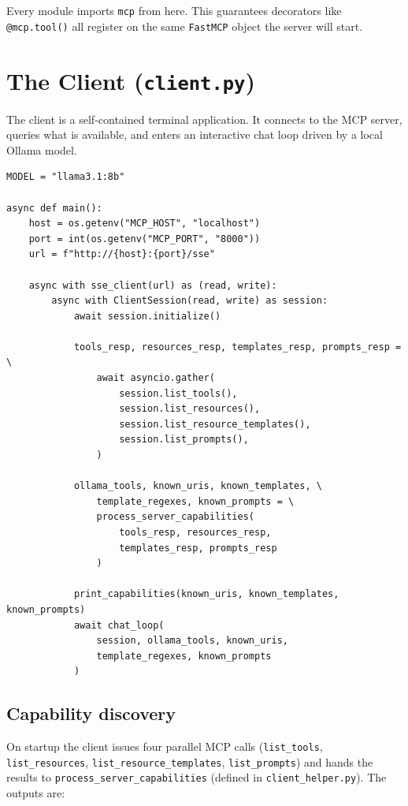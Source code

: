 \documentclass[11pt, a4paper]{article}
\begin{document}
Every module imports \lstinline{mcp} from here. This guarantees decorators like \lstinline{@mcp.tool()} all register on the same \lstinline{FastMCP} object the server will start.

\section{The Client (\texttt{client.py})}

The client is a self-contained terminal application. It connects to the MCP server, queries what is available, and enters an interactive chat loop driven by a local Ollama model.

\begin{lstlisting}[caption={client.py --- startup and main()}]
MODEL = "llama3.1:8b"

async def main():
    host = os.getenv("MCP_HOST", "localhost")
    port = int(os.getenv("MCP_PORT", "8000"))
    url = f"http://{host}:{port}/sse"

    async with sse_client(url) as (read, write):
        async with ClientSession(read, write) as session:
            await session.initialize()

            tools_resp, resources_resp, templates_resp, prompts_resp = \
                await asyncio.gather(
                    session.list_tools(),
                    session.list_resources(),
                    session.list_resource_templates(),
                    session.list_prompts(),
                )

            ollama_tools, known_uris, known_templates, \
                template_regexes, known_prompts = \
                process_server_capabilities(
                    tools_resp, resources_resp,
                    templates_resp, prompts_resp
                )

            print_capabilities(known_uris, known_templates, known_prompts)
            await chat_loop(
                session, ollama_tools, known_uris,
                template_regexes, known_prompts
            )
\end{lstlisting}

\subsection{Capability discovery}
On startup the client issues four parallel MCP calls (\texttt{list\_tools}, \texttt{list\_resources}, \texttt{list\_resource\_templates}, \texttt{list\_prompts}) and hands the results to \texttt{process\_server\_capabilities} (defined in \texttt{client\_helper.py}). The outputs are:
\end{document}
